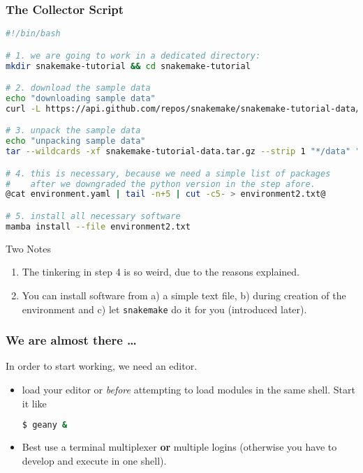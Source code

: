 \begin{frame}[fragile]
  \frametitle{The Collector Script}
  \begin{lstlisting}[language=Bash, style=Shell, basicstyle=\tiny]
#!/bin/bash

# 1. we are going to work in a dedicated directory:
mkdir snakemake-tutorial && cd snakemake-tutorial

# 2. download the sample data
echo "downloading sample data"
curl -L https://api.github.com/repos/snakemake/snakemake-tutorial-data/tarball -o snakemake-tutorial-data.tar.gz

# 3. unpack the sample data
echo "unpacking sample data"
tar --wildcards -xf snakemake-tutorial-data.tar.gz --strip 1 "*/data" "*/environment.yaml"

# 4. this is necessary, because we need a simple list of packages
#    after we downgraded the python version in the step afore.
@cat environment.yaml | tail -n+5 | cut -c5- > environment2.txt@

# 5. install all necessary software
mamba install --file environment2.txt
  \end{lstlisting}
  \begin{block}{Two Notes}
    \begin{enumerate}
     \item The tinkering in step 4 is so weird, due to the reasons explained.
     \item You can install software from a) a simple text file, b) during creation of the environment and c) let \texttt{snakemake} do it for you (introduced later).
    \end{enumerate}
  \end{block}
\end{frame}

\begin{frame}[fragile]
  \frametitle{We are almost there \ldots}
  In order to start working, we need an editor.
  \begin{itemize}[<+->]
   \item load your editor  or  \emph{before} attempting to load modules in the same shell. Start it like
         \begin{lstlisting}[language=Bash, style=Shell]
$ geany & 
         \end{lstlisting}
   \item Best use a terminal multiplexer \textbf{or} multiple logins (otherwise you have to develop and execute in one shell).
  \end{itemize}
\end{frame}



